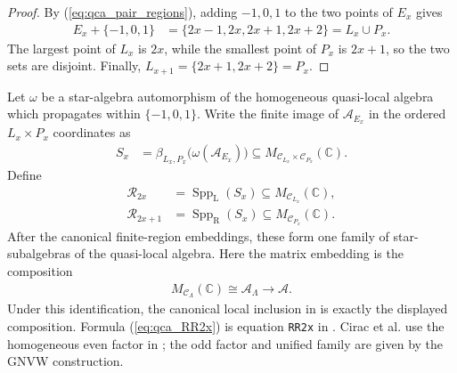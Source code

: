 \begin{proof}\leanok
    By (\ref{eq:qca_pair_regions}), adding $-1,0,1$ to the two
    points of $E_x$ gives
    \begin{align}
        E_x+\{-1,0,1\}
         & =\{2x-1,2x,2x+1,2x+2\}=L_x\cup P_x.
    \end{align}
    The largest point of $L_x$ is $2x$, while the smallest point of $P_x$
    is $2x+1$, so the two sets are disjoint.  Finally,
    $L_{x+1}=\{2x+1,2x+2\}=P_x$.
\end{proof}

\begin{definition}
    \label{def:qca_site_indexed_support_algebras}
    \leanok
    Let $\omega$ be a star-algebra automorphism of the homogeneous
    quasi-local algebra which propagates within $\{-1,0,1\}$.  Write the
    finite image of $\mathcal A_{E_x}$ in the ordered $L_x\times P_x$
    coordinates as
    \begin{align}
        S_x
         & =\beta_{L_x,P_x}\bigl(\omega(\mathcal A_{E_x})\bigr)
        \subseteq
        M_{\mathcal C_{L_x}\times\mathcal C_{P_x}}(\mathbb C).
        \label{eq:qca_site_image}
    \end{align}
    Define
    \begin{align}
        \mathcal R_{2x}
         & =\operatorname{Spp}_{\mathrm L}(S_x)
        \subseteq M_{\mathcal C_{L_x}}(\mathbb C), \\
        \mathcal R_{2x+1}
         & =\operatorname{Spp}_{\mathrm R}(S_x)
        \subseteq M_{\mathcal C_{P_x}}(\mathbb C).
        \label{eq:qca_RR2x}
    \end{align}
    After the canonical finite-region embeddings, these form one family of
    star-subalgebras of the quasi-local algebra.  Here the matrix embedding is
    the composition
    \begin{align}
        M_{\mathcal C_\Lambda}(\mathbb C)
        \cong \mathcal A_\Lambda
        \longrightarrow \mathcal A.
    \end{align}
    Under this identification, the canonical local inclusion in
    \cite[lines~2292--2298]{Cirac2017MPU} is exactly the displayed
    composition.
    Formula (\ref{eq:qca_RR2x}) is equation \texttt{RR2x} in
    \cite[lines~1261--1266]{Gross2012IndexTheory}.  Cirac et al. use the
    homogeneous even factor in
    \cite[lines~2322--2328]{Cirac2017MPU}; the odd factor and unified family
    are given by the GNVW construction.


\end{definition}
